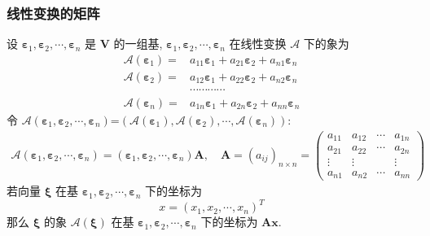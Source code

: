 \documentclass{article}
\begin{document}
			\subsubsection{线性变换的矩阵}
				设 $\boldsymbol \varepsilon_{1}, \boldsymbol \varepsilon_{2}, \cdots, \boldsymbol \varepsilon_{n}$ 是 $\boldsymbol V$ 的一组基, $\boldsymbol \varepsilon_{1}, \boldsymbol \varepsilon_{2}, \cdots, \boldsymbol \varepsilon_{n}$ 在线性变换 $\mathscr{A}$ 下的象为
				$$
				\begin{aligned}
					\mathscr{A}\left(\boldsymbol \varepsilon_{1}\right)=& a_{11} \boldsymbol \varepsilon_{1}+a_{21} \boldsymbol \varepsilon_{2}+a_{n 1} \boldsymbol \varepsilon_{n} \\
					\mathscr{A}\left(\boldsymbol \varepsilon_{2}\right)=& a_{12} \boldsymbol \varepsilon_{1}+a_{22} \boldsymbol \varepsilon_{2}+a_{n 2} \boldsymbol \varepsilon_{n} \\
					& \cdots \cdots \cdots \cdots \\
					\mathscr{A}\left(\boldsymbol \varepsilon_{n}\right)=& a_{1 n} \boldsymbol \varepsilon_{1}+a_{2 n} \boldsymbol \varepsilon_{2}+a_{n n} \boldsymbol \varepsilon_{n}
				\end{aligned}
				$$
				令 $\mathscr{A}\left(\boldsymbol \varepsilon_{1}, \boldsymbol \varepsilon_{2}, \cdots, \boldsymbol \varepsilon_{n}\right)$=$\left(\mathscr{A}\left(\boldsymbol \varepsilon_{1}\right), \mathscr{A}\left(\boldsymbol \varepsilon_{2}\right), \cdots, \mathscr{A}\left(\boldsymbol \varepsilon_{n}\right)\right)$:
				$$
				\begin{gathered}
					\mathscr{A}\left(\boldsymbol \varepsilon_{1}, \boldsymbol \varepsilon_{2}, \cdots, \boldsymbol \varepsilon_{n}\right)=\left(\boldsymbol \varepsilon_{1}, \boldsymbol \varepsilon_{2}, \cdots, \boldsymbol \varepsilon_{n}\right) \boldsymbol{A},\quad
					\boldsymbol{A}=\left(a_{i j}\right)_{n \times n}=\left(\begin{array}{cccc}
						a_{11} & a_{12} & \cdots & a_{1 n} \\
						a_{21} & a_{22} & \cdots & a_{2 n} \\
						\vdots & \vdots & & \vdots \\
						a_{n 1} & a_{n 2} & \cdots & a_{n n}
					\end{array}\right)
				\end{gathered}
				$$
				若向量 $\boldsymbol \xi$ 在基 $\boldsymbol \varepsilon_{1}, \boldsymbol \varepsilon_{2}, \cdots, \boldsymbol \varepsilon_{n}$ 下的坐标为
				$$
				x=\left(x_{1}, x_{2}, \cdots, x_{n}\right)^{T}
				$$
				那么 $\boldsymbol{\xi}$ 的象 $\mathscr{A}(\boldsymbol{\xi})$ 在基 $\boldsymbol \varepsilon_{1}, \boldsymbol \varepsilon_{2}, \cdots, \boldsymbol \varepsilon_{n}$ 下的坐标为 $\boldsymbol{A x}$.
\end{document}
